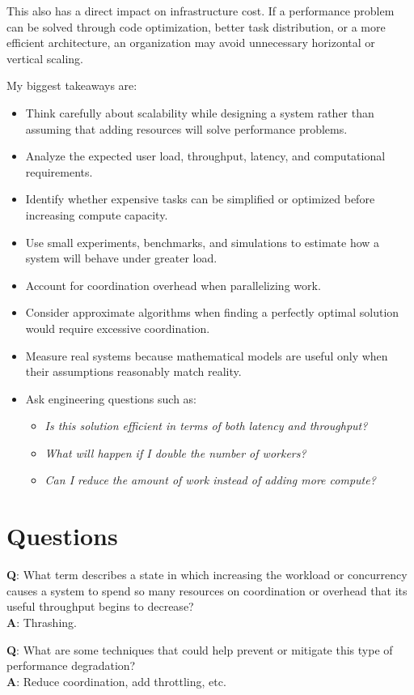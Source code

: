 This also has a direct impact on infrastructure cost. If a performance problem
can be solved through code optimization, better task distribution, or a more
efficient architecture, an organization may avoid unnecessary horizontal or
vertical scaling.


My biggest takeaways are:
\begin{itemize}
    \item Think carefully about scalability while designing a system rather than
          assuming that adding resources will solve performance problems.
    
    \item Analyze the expected user load, throughput, latency, and computational
          requirements.

    \item Identify whether expensive tasks can be simplified or optimized before
          increasing compute capacity.
    
    \item Use small experiments, benchmarks, and simulations to estimate how a
          system will behave under greater load.
    
    \item Account for coordination overhead when parallelizing work.

    \item Consider approximate algorithms when finding a perfectly optimal
          solution would require excessive coordination.

    \item Measure real systems because mathematical models are useful only when
          their assumptions reasonably match reality.

    \item Ask engineering questions such as:
          \begin{itemize}
                \item \textit{Is this solution efficient in terms of both
                      latency and throughput?}
                \item \textit{What will happen if I double the number of
                      workers?}
                \item \textit{Can I reduce the amount of work instead of adding
                      more compute?}
          \end{itemize}
\end{itemize}

\section{Questions}
\textbf{Q}: What term describes a state in which increasing the workload or
concurrency causes a system to spend so many resources on coordination or
overhead that its useful throughput begins to decrease?
\\
\textbf{A}: Thrashing.

\textbf{Q}: What are some techniques that could help prevent or mitigate this
type of performance degradation?
\\
\textbf{A}: Reduce coordination, add throttling, etc.
